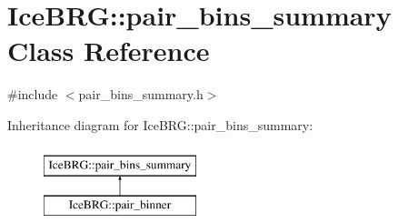 \hypertarget{classIceBRG_1_1pair__bins__summary}{}\section{Ice\+B\+R\+G\+:\+:pair\+\_\+bins\+\_\+summary Class Reference}
\label{classIceBRG_1_1pair__bins__summary}


{\ttfamily \#include $<$pair\+\_\+bins\+\_\+summary.\+h$>$}

Inheritance diagram for Ice\+B\+R\+G\+:\+:pair\+\_\+bins\+\_\+summary\+:\begin{figure}[H]
\begin{center}
\leavevmode
\includegraphics[height=2.000000cm]{classIceBRG_1_1pair__bins__summary}
\end{center}
\end{figure}
